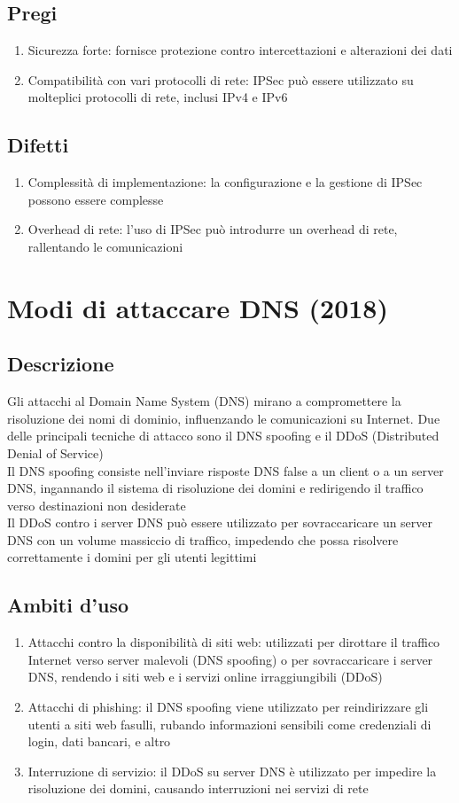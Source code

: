 \documentclass[10pt,oneside,a4paper]{article}
\begin{document}
\begin{enumerate}
\subsection{Pregi}
\begin{enumerate}
\item Sicurezza forte: fornisce protezione contro intercettazioni e alterazioni dei dati
\item Compatibilità con vari protocolli di rete: IPSec può essere utilizzato su molteplici protocolli di rete, inclusi IPv4 e IPv6
\end{enumerate}
\subsection{Difetti}
\begin{enumerate}
\item Complessità di implementazione: la configurazione e la gestione di IPSec possono essere complesse
\item Overhead di rete: l'uso di IPSec può introdurre un overhead di rete, rallentando le comunicazioni
\end{enumerate}
\section{Modi di attaccare DNS (2018)}
\subsection{Descrizione}
Gli attacchi al Domain Name System (DNS) mirano a compromettere la risoluzione dei nomi di dominio, influenzando le comunicazioni su Internet. Due delle principali tecniche di attacco sono il DNS spoofing e il DDoS (Distributed Denial of Service)\\
Il DNS spoofing consiste nell'inviare risposte DNS false a un client o a un server DNS, ingannando il sistema di risoluzione dei domini e redirigendo il traffico verso destinazioni non desiderate\\
Il DDoS contro i server DNS può essere utilizzato per sovraccaricare un server DNS con un volume massiccio di traffico, impedendo che possa risolvere correttamente i domini per gli utenti legittimi
\subsection{Ambiti d'uso}
\begin{enumerate}
\item Attacchi contro la disponibilità di siti web: utilizzati per dirottare il traffico Internet verso server malevoli (DNS spoofing) o per sovraccaricare i server DNS, rendendo i siti web e i servizi online irraggiungibili (DDoS)
\item Attacchi di phishing: il DNS spoofing viene utilizzato per reindirizzare gli utenti a siti web fasulli, rubando informazioni sensibili come credenziali di login, dati bancari, e altro
\item Interruzione di servizio: il DDoS su server DNS è utilizzato per impedire la risoluzione dei domini, causando interruzioni nei servizi di rete
\end{enumerate}

\end{enumerate}
\end{document}
